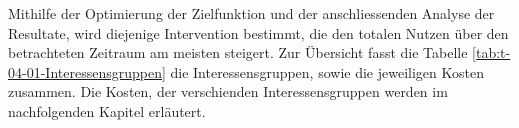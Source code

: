 Mithilfe der Optimierung der Zielfunktion und der anschliessenden Analyse der Resultate, wird diejenige Intervention bestimmt, die den totalen Nutzen über den betrachteten Zeitraum am meisten steigert. 
Zur Übersicht fasst die Tabelle \ref{tab:t-04-01-Interessensgruppen} die Interessensgruppen, sowie die jeweiligen Kosten zusammen. Die Kosten, der verschienden Interessensgruppen werden im nachfolgenden Kapitel erläutert.



\pagebreak

%

